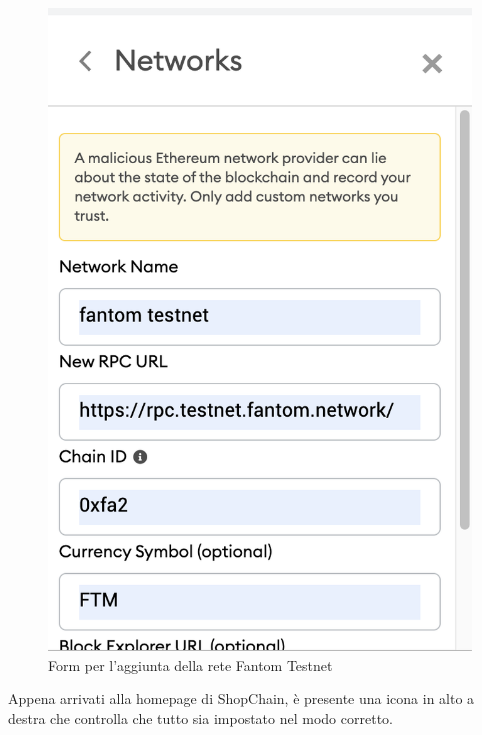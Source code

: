 \begin{figure}[htbp]
    \centering
    \includegraphics{immagini/setmeta2.png}
    \caption{Form per l'aggiunta della rete Fantom Testnet}
\end{figure} 

Appena arrivati alla homepage di ShopChain, è presente una icona in alto a destra che controlla che tutto sia impostato nel modo corretto.